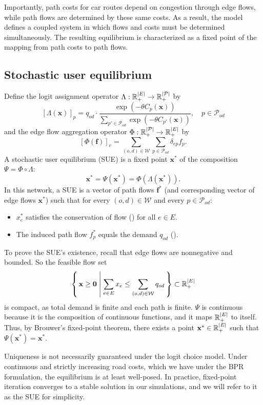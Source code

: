 \documentclass[12pt]{article}
\newcommand{\W}{\mathcal{W}}
\newcommand{\Pset}{\mathcal{P}}
\newcommand{\POD}{\Pset_{od}}
\newcommand{\set}[2]{\left\{\,#1 \;\middle|\; #2\,\right\}}
\newcommand{\R}{\mathbb{R}}
\newcommand{\Rp}{\R_{+}}
\renewcommand{\vec}[1]{\mathbf{#1}}
\DeclarePairedDelimiter{\abs}{\lvert}{\rvert}
\begin{document}
Importantly, path costs for car routes depend on congestion through edge flows, while path flows are determined by these same costs.
As a result, the model defines a coupled system in which flows and costs must be determined simultaneously.
The resulting equilibrium is characterized as a fixed point of the mapping from path costs to path flows.

\subsection{Stochastic user equilibrium}

Define the logit assignment operator $\Lambda: \Rp^{\abs{E}} \rightarrow \Rp^{\abs{\Pset}}$ by
\[
    \left[\Lambda(\vec{x})\right]_p = q_{od} \cdot \frac{\exp{(-\theta C_p(\vec{x}))}}{\sum_{p' \in \POD}{\exp{(-\theta C_{p'}(\vec{x}))}}}, \quad p \in \POD
\]
and the edge flow aggregation operator $\Phi: \Rp^{\abs{\Pset}} \rightarrow \Rp^{\abs{E}}$ by
\[
    \left[\Phi(\vec{f})\right]_e = \sum_{(o, d) \in \W} \sum_{p \in \POD} \delta_{ep} f_p.
\]
A stochastic user equilibrium (SUE) \citep{wardrop1952traffic,daganzo1977stochastic} is a fixed point $\vec{x}^\ast$ of the composition $\Psi = \Phi \circ \Lambda$:
\[
    \vec{x}^\ast = \Psi(\vec{x}^\ast) = \Phi(\Lambda(\vec{x}^\ast)).
\]
In this network, a SUE is a vector of path flows $\vec{f}^\ast$ (and corresponding vector of edge flows $\vec{x}^\ast$) such that for every $(o, d) \in \W$ and every $p \in \POD$:
\begin{itemize}[noitemsep]
    \item $x_e^\ast$ satisfies the conservation of flow () for all $e \in E$.
    \item The induced path flow $f_p^\ast$ equals the demand $q_{od}$ ().
\end{itemize}

To prove the SUE's existence, recall that edge flows are nonnegative and bounded.
So the feasible flow set
\[
    \set{\vec{x} \geq \vec{0}}{\sum_{e \in E} x_e \leq \sum_{(o,d) \in \W} q_{od}} \subset \Rp^{\abs{E}}
\]
is compact, as total demand is finite and each path is finite.
$\Psi$ is continuous because it is the composition of continuous functions, and it maps $\Rp^{\abs{E}}$ to itself.
Thus, by Brouwer's fixed-point theorem, there exists a point $\vec{x}^\ast \in \Rp^{\abs{E}}$ such that $\Psi(\vec{x}^\ast) = \vec{x}^\ast$.

Uniqueness is not necessarily guaranteed under the logit choice model.
Under continuous and strictly increasing road costs, which we have under the BPR formulation, the equilibrium is at least well-posed.
In practice, fixed-point iteration converges to a stable solution in our simulations, and we will refer to it as the SUE for simplicity.
\end{document}
